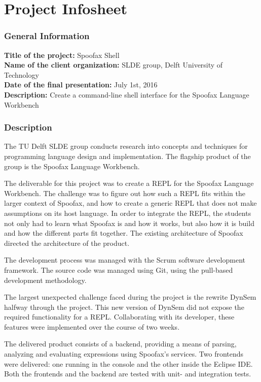 \chapter{Project Infosheet}
\label{cha:infosheet}
\newpage

\noindent
\subsection*{General Information}

\textbf{Title of the project:} Spoofax Shell\\
\textbf{Name of the client organization:} SLDE group, Delft University of Technology\\
\textbf{Date of the final presentation:} July 1st, 2016\\
\textbf{Description:} Create a command-line shell interface for the Spoofax
Language Workbench

\subsection*{Description}

The TU Delft SLDE group conducts research into concepts and techniques for
programming language design and implementation. The flagship product of the
group is the Spoofax Language Workbench.

The deliverable for this project was to create a REPL for the Spoofax Language
Workbench. The challenge was to figure out how such a REPL fits within the larger
context of Spoofax, and how to create a generic REPL that does not make assumptions
on its host language. In order to integrate the REPL, the students not only had
to learn what Spoofax is and how it works, but also how it is build and how the
different parts fit together. The existing architecture of Spoofax directed the
architecture of the product.

The development process was managed with the Scrum software development
framework. The source code was managed using Git, using the pull-based
development methodology.

The largest unexpected challenge faced during the project is the rewrite DynSem
halfway through the project. This new version of DynSem did not expose the
required functionality for a REPL. Collaborating with its developer, these
features were implemented over the course of two weeks.

The delivered product consists of a backend, providing a means of parsing,
analyzing and evaluating expressions using Spoofax's services. Two frontends
were delivered: one running in the console and the other inside the Eclipse IDE.
Both the frontends and the backend are tested with unit- and integration tests.

